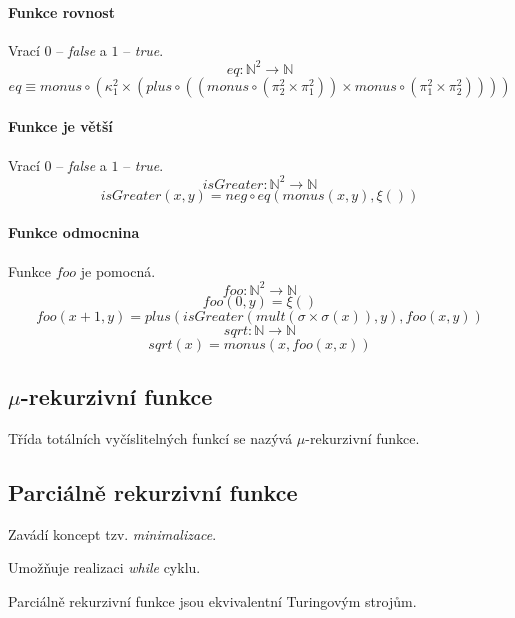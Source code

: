 \paragraph*{Funkce rovnost} Vrací $0$ -- \textit{false} a $1$ -- \textit{true}.
$$ eq : \mathbb{N}^2 \rightarrow \mathbb{N} $$
$$ eq \equiv monus \circ ( \kappa_1^2 \times ( plus \circ ((monus \circ (\pi_2^2 \times \pi_1^2)) \times monus \circ (\pi_1^2 \times \pi_2^2 )))) $$

\paragraph*{Funkce je větší} Vrací $0$ -- \textit{false} a $1$ -- \textit{true}.
$$ isGreater : \mathbb{N}^2 \rightarrow \mathbb{N} $$
$$ isGreater(x, y) = neg \circ eq(monus(x, y), \xi()) $$

\paragraph*{Funkce odmocnina} Funkce $foo$ je pomocná.
$$ foo : \mathbb{N}^2 \rightarrow \mathbb{N} $$
$$ foo(0, y) = \xi() $$
$$ foo(x+1, y) = plus (isGreater (mult(\sigma \times \sigma(x)), y), foo(x, y)) $$
$$ sqrt : \mathbb{N} \rightarrow \mathbb{N} $$
$$ sqrt(x) = monus (x,  foo(x, x)) $$

\subsection{$\mu$-rekurzivní funkce}

\begin{compactitem}
    \item Třída totálních vyčíslitelných funkcí se nazývá $\mu$-rekurzivní funkce.
\end{compactitem}

\subsection{Parciálně rekurzivní funkce}

\begin{compactitem}
    \item Zavádí koncept tzv. \textit{minimalizace}.
    \item Umožňuje realizaci \textit{while} cyklu.
    \item Parciálně rekurzivní funkce jsou ekvivalentní Turingovým strojům.
    \item {}
\end{compactitem}

